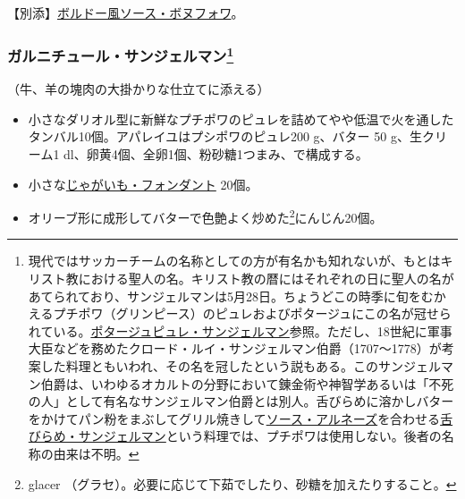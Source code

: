 \begin{recette}
【別添】\protect\hyperlink{sauce-bonnefoy}{ボルドー風ソース・ボヌフォワ}。

\atoaki{}

\hypertarget{garniture-saint-germain}{%
\subsubsection[ガルニチュール・サンジェルマン]{\texorpdfstring{ガルニチュール・サンジェルマン\footnote{現代ではサッカーチームの名称としての方が有名かも知れないが、もとはキリスト教における聖人の名。キリスト教の暦にはそれぞれの日に聖人の名があてられており、サンジェルマンは5月28日。ちょうどこの時季に旬をむかえるプチポワ（グリンピース）のピュレおよびポタージュにこの名が冠せられている。\protect\hyperlink{puree-saint-germain}{ポタージュピュレ・サンジェルマン}参照。ただし、18世紀に軍事大臣などを務めたクロード・ルイ・サンジェルマン伯爵（1707〜1778）が考案した料理ともいわれ、その名を冠したという説もある。このサンジェルマン伯爵は、いわゆるオカルトの分野において錬金術や神智学あるいは「不死の人」として有名なサンジェルマン伯爵とは別人。舌びらめに溶かしバターをかけてパン粉をまぶしてグリル焼きして\protect\hyperlink{sauce-bearnaise}{ソース・アルネーズ}を合わせる\protect\hyperlink{sole-saint-germain}{舌びらめ・サンジェルマン}という料理では、プチポワは使用しない。後者の名称の由来は不明。}}{ガルニチュール・サンジェルマン}}\label{garniture-saint-germain}}



（牛、羊の塊肉の大掛かりな仕立てに添える）

\begin{itemize}
\item
  小さなダリオル型に新鮮なプチポワのピュレを詰めてやや低温で火を通したタンバル10個。アパレイユはプシポワのピュレ200
  g、バター 50 g、生クリーム1
  dl、卵黄4個、全卵1個、粉砂糖1つまみ、で構成する。
\item
  小さな\protect\hyperlink{pommes-de-terreux5cux2520fondantes}{じゃがいも・フォンダント}
  20個。
\item
  オリーブ形に成形してバターで色艶よく炒めた\footnote{glacer
    （グラセ）。必要に応じて下茹でしたり、砂糖を加えたりすること。}にんじん20個。
\end{itemize}


\end{recette}

